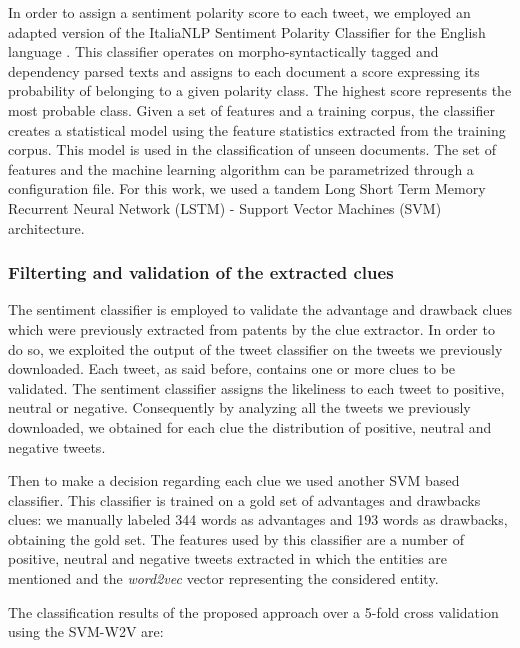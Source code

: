 \documentclass[b5paper,]{book}
\theoremstyle{definition}
\theoremstyle{definition}
\theoremstyle{definition}
\theoremstyle{remark}
\begin{document}
In order to assign a sentiment polarity score to each tweet, we employed
an adapted version of the ItaliaNLP Sentiment Polarity Classifier for
the English language \citep{cimino2014linguistically}. This classifier
operates on morpho-syntactically tagged and dependency parsed texts and
assigns to each document a score expressing its probability of belonging
to a given polarity class. The highest score represents the most
probable class. Given a set of features and a training corpus, the
classifier creates a statistical model using the feature statistics
extracted from the training corpus. This model is used in the
classification of unseen documents. The set of features and the machine
learning algorithm can be parametrized through a configuration file. For
this work, we used a tandem Long Short Term Memory Recurrent Neural
Network (LSTM) - Support Vector Machines (SVM) architecture.

\subsubsection*{Filterting and validation of the extracted
clues}\label{filterting-and-validation-of-the-extracted-clues}

The sentiment classifier is employed to validate the advantage and
drawback clues which were previously extracted from patents by the clue
extractor. In order to do so, we exploited the output of the tweet
classifier on the tweets we previously downloaded. Each tweet, as said
before, contains one or more clues to be validated. The sentiment
classifier assigns the likeliness to each tweet to positive, neutral or
negative. Consequently by analyzing all the tweets we previously
downloaded, we obtained for each clue the distribution of positive,
neutral and negative tweets.

Then to make a decision regarding each clue we used another SVM based
classifier. This classifier is trained on a gold set of advantages and
drawbacks clues: we manually labeled 344 words as advantages and 193
words as drawbacks, obtaining the gold set. The features used by this
classifier are a number of positive, neutral and negative tweets
extracted in which the entities are mentioned and the \emph{word2vec}
vector representing the considered entity.

The classification results of the proposed approach over a 5-fold cross
validation using the SVM-W2V are:
\end{document}
